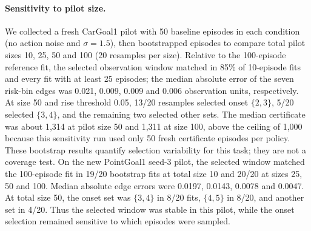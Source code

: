\documentclass{article}
\begin{document}
\paragraph{Sensitivity to pilot size.} We collected a fresh CarGoal1 pilot with 50 baseline episodes in each condition (no action noise and $\sigma=1.5$), then bootstrapped episodes to compare total pilot sizes 10, 25, 50 and 100 (20 resamples per size). Relative to the 100-episode reference fit, the selected observation window matched in 85\% of 10-episode fits and every fit with at least 25 episodes; the median absolute error of the seven risk-bin edges was 0.021, 0.009, 0.009 and 0.006 observation units, respectively. At size 50 and rise threshold 0.05, 13/20 resamples selected onset $\{2,3\}$, 5/20 selected $\{3,4\}$, and the remaining two selected other sets. The median certificate was about 1,314 at pilot size 50 and 1,311 at size 100, above the ceiling of 1,000 because this sensitivity run used only 50 fresh certificate episodes per policy. These bootstrap results quantify selection variability for this task; they are not a coverage test. On the new PointGoal1 seed-3 pilot, the selected window matched the 100-episode fit in 19/20 bootstrap fits at total size 10 and 20/20 at sizes 25, 50 and 100. Median absolute edge errors were 0.0197, 0.0143, 0.0078 and 0.0047. At total size 50, the onset set was $\{3,4\}$ in 8/20 fits, $\{4,5\}$ in 8/20, and another set in 4/20. Thus the selected window was stable in this pilot, while the onset selection remained sensitive to which episodes were sampled.

\begin{table}[ht]
\centering
\caption{PointGoal1, training seed 0 (baseline cost $J_B=3.7$), $n=400$ episodes per policy, ceiling 1000. $J_{\text{aware}}$ is shown for both alphabets. TV and KS$^+$ (all thresholds) are plug-in; KS$^+_{\mathcal T}$ is the plug-in bound of Theorem~\ref{thm:mono} with $\mathcal T=\{6\}$, $\eta=0.05$; the last three columns are finite-sample bounds (Hoeff.\ and EB with the same $\mathcal T$, $\eta$). Other seeds and CarGoal1: Appendix~\ref{app:sg}.}
\label{tab:safetygym}
\small

\end{table}
\end{document}
